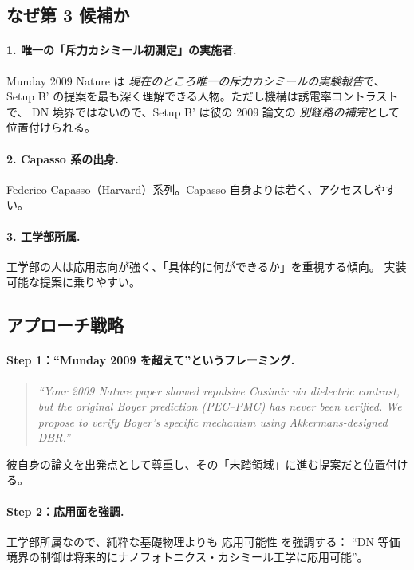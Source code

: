 \documentclass[11pt,a4paper]{article}
\def\textbf#1{#1}%
\begin{document}
\subsection{なぜ第 3 候補か}

\paragraph{1. 唯一の「斥力カシミール初測定」の実施者.}
Munday 2009 Nature は \emph{現在のところ唯一の斥力カシミールの実験報告}で、
Setup B' の提案を最も深く理解できる人物。\textbf{ただし機構は誘電率コントラストで、
DN 境界ではない}ので、Setup B' は彼の 2009 論文の \emph{別経路の補完}として
位置付けられる。

\paragraph{2. Capasso 系の出身.}
Federico Capasso（Harvard）系列。Capasso 自身よりは若く、アクセスしやすい。

\paragraph{3. 工学部所属.}
工学部の人は応用志向が強く、「具体的に何ができるか」を重視する傾向。
実装可能な提案に乗りやすい。

\subsection{アプローチ戦略}

\paragraph{Step 1：``Munday 2009 を超えて''というフレーミング.}
\begin{quote}
\itshape
``Your 2009 Nature paper showed repulsive Casimir via dielectric contrast,
but the original Boyer prediction (PEC--PMC) has never been verified.
We propose to verify Boyer's specific mechanism using Akkermans-designed DBR.''
\end{quote}
彼自身の論文を出発点として尊重し、その「未踏領域」に進む提案だと位置付ける。

\paragraph{Step 2：応用面を強調.}
工学部所属なので、純粋な基礎物理よりも \textbf{応用可能性} を強調する：
``DN 等価境界の制御は将来的にナノフォトニクス・カシミール工学に応用可能''。
\end{document}
